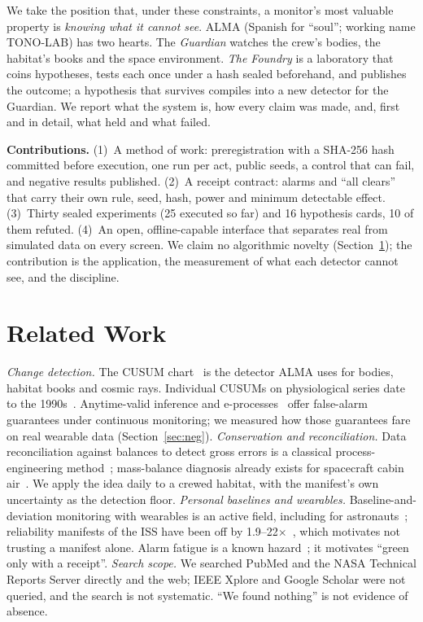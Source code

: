 \documentclass[conference]{IEEEtran}
\begin{document}
We take the position that, under these constraints, a monitor's most valuable property is \emph{knowing what it cannot see}. ALMA (Spanish for ``soul''; working name TONO-LAB) has two hearts. The \emph{Guardian} watches the crew's bodies, the habitat's books and the space environment. \emph{The Foundry} is a laboratory that coins hypotheses, tests each once under a hash sealed beforehand, and publishes the outcome; a hypothesis that survives compiles into a new detector for the Guardian. We report what the system is, how every claim was made, and, first and in detail, what held and what failed.

\textbf{Contributions.} (1)~A method of work: preregistration with a SHA-256 hash committed before execution, one run per act, public seeds, a control that can fail, and negative results published. (2)~A receipt contract: alarms and ``all clears'' that carry their own rule, seed, hash, power and minimum detectable effect. (3)~Thirty sealed experiments (25 executed so far) and 16 hypothesis cards, 10 of them refuted. (4)~An open, offline-capable interface that separates real from simulated data on every screen.
We claim no algorithmic novelty (Section~\ref{sec:related}); the contribution is the application, the measurement of what each detector cannot see, and the discipline.

\section{Related Work}\label{sec:related}
\emph{Change detection.} The CUSUM chart~\cite{page1954} is the detector ALMA uses for bodies, habitat books and cosmic rays. Individual CUSUMs on physiological series date to the 1990s~\cite{cornelissen1997}. Anytime-valid inference and e-processes~\cite{ramdas2023,shin2022} offer false-alarm guarantees under continuous monitoring; we measured how those guarantees fare on real wearable data (Section~\ref{sec:neg}).
\emph{Conservation and reconciliation.} Data reconciliation against balances to detect gross errors is a classical process-engineering method~\cite{tamhane1985}; mass-balance diagnosis already exists for spacecraft cabin air~\cite{kayatin2021}. We apply the idea daily to a crewed habitat, with the manifest's own uncertainty as the detection floor.
\emph{Personal baselines and wearables.} Baseline-and-deviation monitoring with wearables is an active field, including for astronauts~\cite{gupta2025,zheng2023}; reliability manifests of the ISS have been off by 1.9--22$\times$~\cite{jones2019}, which motivates not trusting a manifest alone. Alarm fatigue is a known hazard~\cite{cvach2012}; it motivates ``green only with a receipt''.
\emph{Search scope.} We searched PubMed and the NASA Technical Reports Server directly and the web; IEEE Xplore and Google Scholar were not queried, and the search is not systematic. ``We found nothing'' is not evidence of absence.
\end{document}
